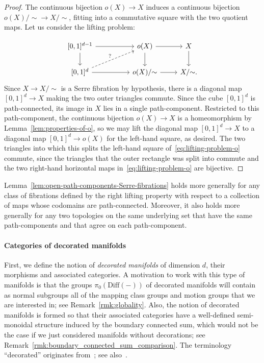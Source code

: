 \documentclass[AHL,Unicode,published]{cedram}
\newcommand{\Diff}{\mathrm{Diff}}
\begin{document}
\begin{proof}
The continuous bijection $o(X) \to X$ induces a continuous bijection $o(X)/{\sim} \to X/{\sim}$, fitting into a commutative square with the two quotient maps. Let us consider the lifting problem:

\begin{equation}\label{eq:lifting-problem-o}
\begin{tikzcd}
{[0,1]^{d-1}} \ar[rr] \ar[d] && o(X) \ar[d] \ar[r] & X \ar[d] \\
{[0,1]^d} \ar[rr] \ar[densely dashed,rru,"?"] && o(X)/{\sim} \ar[r] & X/{\sim}.
\end{tikzcd}
\end{equation}
Since $X \to X/{\sim}$ is a Serre fibration by hypothesis, there is a diagonal map $[0,1]^d \to X$ making the two outer triangles commute. Since the cube $[0,1]^d$ is path-connected, its image in $X$ lies in a single path-component. Restricted to this path-component, the continuous bijection $o(X) \to X$ is a homeomorphism by Lemma~\ref{lem:properties-of-o}, so we may lift the diagonal map $[0,1]^d \to X$ to a diagonal map $[0,1]^d \to o(X)$ for the left-hand square, as desired. The two triangles into which this splits the left-hand square of~\eqref{eq:lifting-problem-o} commute, since the triangles that the outer rectangle was split into commute and the two right-hand horizontal maps in~\eqref{eq:lifting-problem-o} are bijective.
\end{proof}

\begin{rema}
Lemma~\ref{lem:open-path-components-Serre-fibrations} holds more generally for any class of fibrations defined by the right lifting property with respect to a collection of maps whose codomains are path-connected. Moreover, it also holds more generally for any two topologies on the same underlying set that have the same path-components and that agree on each path-component.
\end{rema}


\paragraph*{Categories of decorated manifolds}
First, we define the notion of \emph{decorated manifolds} of dimension $d$, their morphisms and associated categories. A motivation to work with this type of manifolds is that the groups $\pi_{0}(\Diff(-))$ of decorated manifolds will contain as normal subgroups all of the mapping class groups and motion groups that we are interested in; see Remark~\ref{rmk:globality}. Also, the notion of decorated manifolds is formed so that their associated categories have a well-defined semi-monoidal structure induced by the boundary connected sum, which would not be the case if we just considered manifolds without decorations; see Remark~\ref{rmk:boundary_connected_sum_comparison}. The terminology ``decorated'' originates from~\cite{BodigheimerTillmann}; see also~\cite{BasualdoBonatto}.
\end{document}
